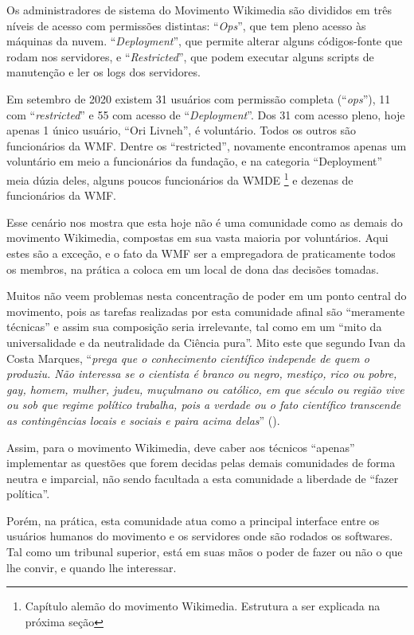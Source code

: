 Os administradores de sistema do Movimento Wikimedia são divididos em três níveis de acesso com permissões distintas: ``\textit{Ops}'', que tem pleno acesso às máquinas da nuvem. ``\textit{Deployment}'', que permite alterar alguns códigos-fonte que rodam nos servidores, e ``\textit{Restricted}'', que podem executar alguns scripts de manutenção e ler os logs dos servidores.

Em setembro de 2020 existem 31 usuários com permissão completa (``\textit{ops}''),  11 com ``\textit{restricted}'' e 55 com acesso de ``\textit{Deployment}''. Dos 31 com acesso pleno, hoje apenas 1 único usuário, ``Ori Livneh'', é voluntário. Todos os outros são funcionários da WMF. Dentre os ``restricted'', novamente encontramos apenas um voluntário em meio a funcionários da fundação, e na categoria ``Deployment'' meia dúzia deles, alguns poucos funcionários da WMDE \footnote{Capítulo alemão do movimento Wikimedia. Estrutura a ser explicada na próxima seção} e dezenas de funcionários da WMF. 

Esse cenário nos mostra que esta hoje não é uma comunidade como as demais do movimento Wikimedia, compostas em sua vasta maioria por voluntários. Aqui estes são a exceção, e o fato da WMF ser a empregadora de praticamente todos os membros, na prática a coloca em um local de dona das decisões tomadas.

Muitos não veem problemas nesta concentração de poder em um ponto central do movimento, pois as tarefas realizadas por esta comunidade afinal são ``meramente técnicas'' e assim sua composição seria irrelevante, tal como em um ``mito da universalidade e da neutralidade da Ciência pura''. Mito este que segundo Ivan da Costa Marques, ``\textit{prega que o conhecimento científico independe de quem o produziu. Não interessa se o cientista é branco ou negro, mestiço, rico ou pobre, gay, homem, mulher, judeu, muçulmano ou católico, em que século ou região vive ou sob que regime político trabalha, pois a verdade ou o fato científico transcende as contingências locais e sociais e paira acima delas}'' (\cite[p.13]{marques_2005}).

Assim, para o movimento Wikimedia, deve caber aos técnicos ``apenas'' implementar as questões que forem decidas pelas demais comunidades de forma neutra e imparcial, não sendo facultada a esta comunidade a liberdade de ``fazer política''.

Porém, na prática, esta comunidade atua como a principal interface entre os usuários humanos do movimento e os servidores onde são rodados os softwares. Tal como um tribunal superior, está em suas mãos o poder de fazer ou não o que lhe convir, e quando lhe interessar.

